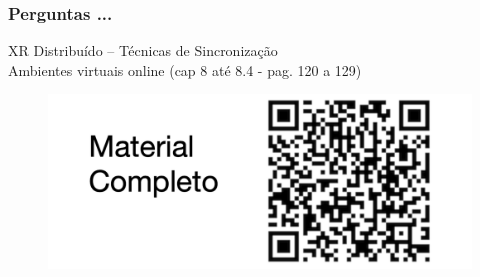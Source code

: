 \documentclass{beamer}
\begin{document}
\begin{frame}
  \frametitle{Perguntas ...}
  XR Distribuído – Técnicas de Sincronização \\
  Ambientes virtuais online (cap 8 até 8.4 - pag. 120 a 129)
  \begin{figure}[h]
    \centering
    \vspace{-18pt}
    \includegraphics[width=1.03\textwidth]{../qrcode_udesc_trabalho_05.png}
    \vspace{-20pt}
  \end{figure}
\end{frame}
\end{document}
